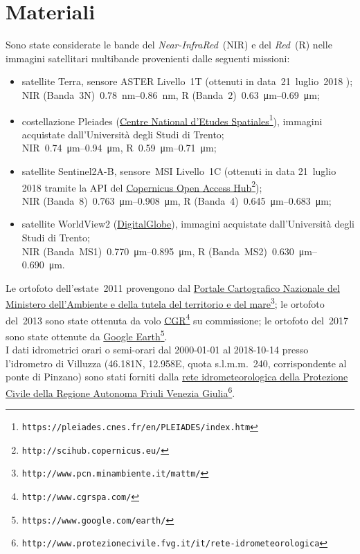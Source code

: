 \section{Materiali}
Sono state considerate le bande del \emph{Near-InfraRed}~(NIR) e del \emph{Red}~(R) nelle immagini satellitari multibande provenienti dalle seguenti missioni:
%
\begin{itemize}
	\item satellite Terra, sensore ASTER Livello~1T (ottenuti in data~21~luglio~2018 );  
		\\
		NIR (Banda~3N)~\SIrange[range-phrase={-}]{0.78}{0.86}{\nano\m}, R (Banda~2)~\SIrange[range-phrase={-}]{0.63}{0.69}{\micro\m};
	\item costellazione Pleiades (\href{https://pleiades.cnes.fr/en/PLEIADES/index.htm}{Centre National d'Etudes Spatiales}\footnote{\texttt{https://pleiades.cnes.fr/en/PLEIADES/index.htm}}), immagini acquistate dall'Università degli Studi di Trento; 
		\\
		NIR~\SIrange[range-phrase={-}]{0.74}{0.94}{\micro\m}, R~\SIrange[range-phrase={-}]{0.59}{0.71}{\micro\m};
	\item satellite Sentinel2A-B, sensore~MSI Livello~1C (ottenuti in data 21~luglio 2018 tramite la API del \href{http://scihub.copernicus.eu/}{Copernicus Open Access Hub}\footnote{\texttt{http://scihub.copernicus.eu/}});
		\\
		NIR (Banda~8)~\SIrange[range-phrase={-}]{0.763}{0.908}{\micro\m}, R (Banda~4)~\SIrange[range-phrase={-}]{0.645}{0.683}{\micro\m};
	\item satellite WorldView2  (\href{https://dg-cms-uploads-production.s3.amazonaws.com/uploads/document/file/98/WorldView2-DS-WV2-rev2.pdf}{DigitalGlobe}), immagini acquistate dall'Università degli Studi di Trento;
		\\
		NIR (Banda~MS1)~\SIrange[range-phrase={-}]{0.770}{0.895}{\micro\m}, R (Banda~MS2)~\SIrange[range-phrase={-}]{0.630}{0.690}{\micro\m}.
\end{itemize}
%

Le ortofoto dell'estate~2011 provengono dal \href{http://www.pcn.minambiente.it/mattm/}{Portale Cartografico Nazionale del Ministero dell'Ambiente e della tutela del territorio e del mare}\footnote{\texttt{http://www.pcn.minambiente.it/mattm/}};
le ortofoto del~2013 sono state ottenuta da volo \href{http://www.cgrspa.com/}{CGR}\footnote{\texttt{http://www.cgrspa.com/}} su commissione; 
le ortofoto del~2017 sono state ottenute da \href{https://www.google.com/earth/}{Google Earth}\footnote{\texttt{https://www.google.com/earth/}}.
\\
I dati idrometrici orari o semi-orari dal 2000-01-01 al 2018-10-14 presso l'idrometro di Villuzza (\num{46.181}N, \num{12.958}E, quota s.l.m.m.~\num{240}, corrispondente al ponte di Pinzano) sono stati forniti dalla \href{http://www.protezionecivile.fvg.it/it/rete-idrometeorologica}{rete idrometeorologica della Protezione Civile della Regione Autonoma Friuli Venezia Giulia}\footnote{\texttt{http://www.protezionecivile.fvg.it/it/rete-idrometeorologica}}.


